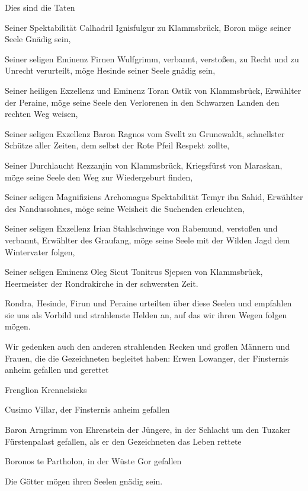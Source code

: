 Dies sind die Taten\par\smallskip
Seiner Spektabilität Calhadril Ignisfulgur zu Klammsbrück, Boron möge seiner Seele Gnädig sein,\par
Seiner seligen Eminenz Firnen Wulfgrimm, verbannt, verstoßen, zu Recht und zu Unrecht verurteilt, möge Hesinde seiner Seele gnädig sein,\par\smallskip
Seiner heiligen Exzellenz und Eminenz Toran Ostik von Klammsbrück, Erwählter der Peraine, möge seine Seele den Verlorenen in den Schwarzen Landen den rechten Weg weisen,\par\smallskip
Seiner seligen Exzellenz Baron Ragnos vom Svellt zu Grunewaldt, schnellster Schütze aller Zeiten, dem selbst der Rote Pfeil  Respekt zollte,\par\smallskip
Seiner Durchlaucht Rezzanjin von Klammsbrück, Kriegsfürst von Maraskan, möge seine Seele den Weg zur Wiedergeburt finden,\par\smallskip
Seiner seligen Magnifiziens Archomagus Spektabilität Temyr ibn Sahid, Erwählter des Nandussohnes, möge seine Weisheit die Suchenden erleuchten,\par\smallskip
Seiner seligen Exzellenz Irian Stahlschwinge von Rabemund, verstoßen und verbannt, Erwählter des Graufang, möge seine Seele mit der Wilden Jagd dem Wintervater folgen,\par\smallskip
Seiner seligen Eminenz Oleg Sicut Tonitrus Sjepsen von Klammsbrück, Heermeister der Rondrakirche in der schwersten Zeit.\par\smallskip
Rondra, Hesinde, Firun und Peraine urteilten über diese Seelen und empfahlen sie uns als Vorbild und strahlenste Helden an, auf das wir ihren Wegen folgen mögen.\par\medskip

Wir gedenken auch den anderen strahlenden Recken und großen Männern und Frauen, die die Gezeichneten begleitet haben:
Erwen Lowanger, der Finsternis anheim gefallen und gerettet\par
Frenglion Krennelsieks\par
Cusimo Villar, der Finsternis anheim gefallen\par
Baron Arngrimm von Ehrenstein der Jüngere, in der Schlacht um den Tuzaker Fürstenpalast gefallen, als er den Gezeichneten das Leben rettete\par
Boronos te Partholon, in der Wüste Gor gefallen\par
Die Götter mögen ihren Seelen gnädig sein.\par\medskip

